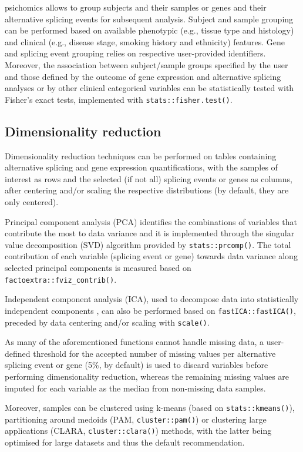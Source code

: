 psichomics allows to group subjects and their samples or genes and their alternative splicing events for subsequent analysis. Subject and sample grouping can be performed based on available phenotypic (e.g., tissue type and histology) and clinical (e.g., disease stage, smoking history and ethnicity) features. Gene and splicing event grouping relies on respective user-provided identifiers. Moreover, the association between subject/sample groups specified by the user and those defined by the outcome of gene expression and alternative splicing analyses or by other clinical categorical variables can be statistically tested with Fisher's exact tests, implemented with \texttt{stats::fisher.test()}.

\subsection{Dimensionality reduction}
\label{subsec:psichomics-pca}

Dimensionality reduction techniques can be performed on tables containing alternative splicing and gene expression quantifications, with the samples of interest as rows and the selected (if not all) splicing events or genes as columns, after centering and/or scaling the respective distributions (by default, they are only centered).

Principal component analysis (PCA) identifies the combinations of variables that contribute the most to data variance \cite{ringner:2008ve} and it is implemented through the singular value decomposition (SVD) algorithm provided by \texttt{stats::prcomp()}. The total contribution of each variable (splicing event or gene) towards data variance along selected principal components is measured based on \texttt{factoextra::fviz\_contrib()}.

Independent component analysis (ICA), used to decompose data into statistically independent components \cite{hyvarinen:2000vk}, can also be performed based on \texttt{fastICA::fastICA()}, preceded by data centering and/or scaling with \texttt{scale()}.

As many of the aforementioned functions cannot handle missing data, a user-defined threshold for the accepted number of missing values per alternative splicing event or gene (5\%, by default) is used to discard variables before performing dimensionality reduction, whereas the remaining missing values are imputed for each variable as the median from non-missing data samples.

Moreover, samples can be clustered using k-means (based on \texttt{stats::kmeans()}), partitioning around medoids (PAM, \texttt{cluster::pam()}) or clustering large applications (CLARA, \texttt{cluster::clara()}) methods, with the latter being optimised for large datasets and thus the default recommendation.

